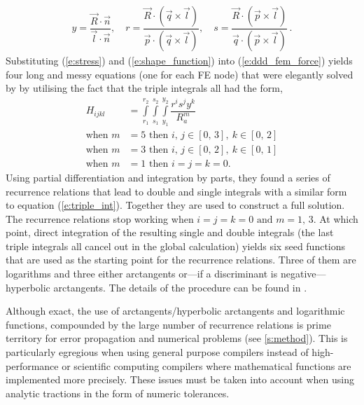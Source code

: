 \documentclass[11pt]{iopart}
\begin{document}
%
\begin{align}
    y = \dfrac{\vec{R}\cdot \vec{n}}{\vec{l}\cdot \vec{n}} \label{se:problem},\quad
    r = \dfrac{\vec{R}\cdot (\vec{q} \times \vec{l})}{\vec{p}\cdot (\vec{q} \times \vec{l})}, \quad
    s = \dfrac{\vec{R}\cdot (\vec{p} \times \vec{l})}{\vec{q}\cdot (\vec{p} \times \vec{l})}\,.
\end{align}
%
Substituting (\ref{e:stress}) and (\ref{e:shape_function}) into (\ref{e:ddd_fem_force}) yields four long and messy equations (one for each FE node) that were elegantly solved by \citet{Queyreau} by utilising the fact that the triple integrals all had the form,
%
\begin{align}
    H_{ijkl}        & = \int\limits_{r_{1}}^{r_{2}}\int\limits_{s_{1}}^{s_{2}}\int\limits_{y_{1}}^{y_{2}} \dfrac{r^i s^j y^k}{R_{a}^{m}}\label{e:triple_int} \\
    \textrm{when }m & = 5 \textrm{ then } i,\, j \in [0,\,3],~k \in [0,\,2]\nonumber                                                                         \\
    \textrm{when }m & = 3 \textrm{ then } i,\, j \in [0,\,2],~k \in [0,\,1]\nonumber                                                                         \\
    \textrm{when }m & = 1 \textrm{ then } i = j = k = 0\nonumber.
\end{align}
%
Using partial differentiation and integration by parts, they found a series of recurrence relations that lead to double and single integrals with a similar form to equation (\ref{e:triple_int}). Together they are used to construct a full solution. The recurrence relations stop working when $i = j = k = 0 \textrm{ and } m = 1,\, 3$. At which point, direct integration of the resulting single and double integrals (the last triple integrals all cancel out in the global calculation) yields six seed functions that are used as the starting point for the recurrence relations. Three of them are logarithms and three either arctangents or---if a discriminant is negative---hyperbolic arctangents. The details of the procedure can be found in \cite{Queyreau}.

Although exact, the use of arctangents/hyperbolic arctangents and logarithmic functions, compounded by the large number of recurrence relations is prime territory for error propagation and numerical problems (see \cref{s:method}). This is particularly egregious when using general purpose compilers instead of high-performance or scientific computing compilers where mathematical functions are implemented more precisely. These issues must be taken into account when using analytic tractions in the form of numeric tolerances.
\end{document}
